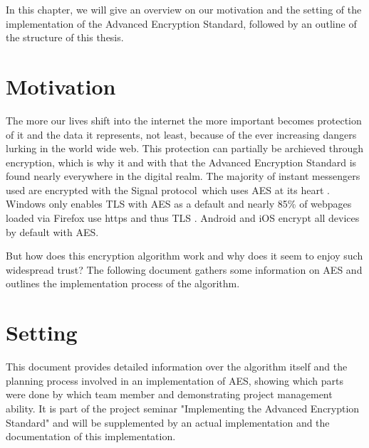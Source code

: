 
In this chapter, we will give an overview on our motivation and the setting of the implementation of the Advanced Encryption Standard, followed by an outline of the structure of this thesis.
 

\section{Motivation}
\label{ch:motivation}
The more our lives shift into the internet the more important becomes protection of it and the data it represents, not least, because of the ever increasing dangers lurking in the world wide web. This protection can partially be archieved through encryption, which is why it and with that the Advanced Encryption Standard is found nearly everywhere in the digital realm. The majority  of instant messengers used \cite{instantmessages} are encrypted with the Signal protocol\cite{whatsapp}\cite{fbmessenger}\, which uses \ac{AES} at its heart \cite[ch. 5.2]{signal}. Windows only enables TLS with \ac{AES} as a default \cite{wintls} and nearly 85\% of webpages loaded via Firefox use https and thus TLS \cite{fftelem}. Android \cite{android} and iOS \cite{ios}encrypt all devices by default with \ac{AES}. 

But how does this encryption algorithm work and why does it seem to enjoy such widespread trust? The following document gathers some information on \ac{AES} and outlines the implementation process of the algorithm.

\section{Setting}
\label{ch:setting}

This document provides detailed information over the algorithm itself and the planning process involved in an implementation of \ac{AES}, showing which parts were done by which team member and demonstrating project management ability. It is part of the project seminar "Implementing the Advanced Encryption Standard" and will be supplemented by an actual implementation and the documentation of this implementation.

